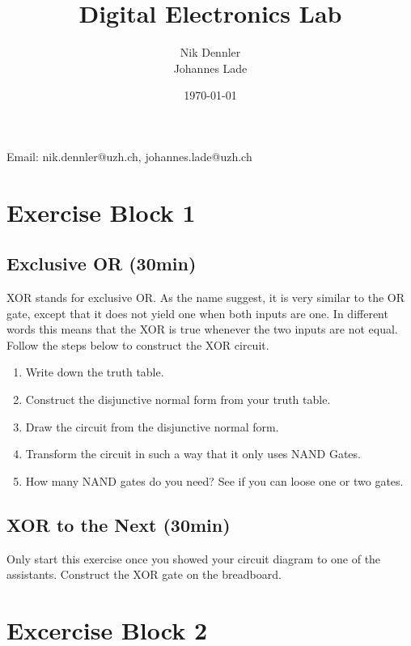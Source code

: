 \documentclass[10pt,a4paper]{article}
\author{Nik Dennler \\ Johannes Lade}
\title{Digital Electronics Lab}
\date{\today{}}
\begin{document}
	
\begin{titlepage}
	\maketitle
		\begin{center}
			Email: nik.dennler@uzh.ch, johannes.lade@uzh.ch
		\end{center}
	\thispagestyle{empty}
\end{titlepage}




\tableofcontents
\newpage
\newpage
\section{Exercise Block 1}
\label{sec:exercise-block-1}

\subsection{Exclusive OR (30min)}\label{subsec:ex-1}

XOR stands for exclusive OR. As the name suggest, it is very similar to the OR gate, except that it does not yield one when both inputs are one. In different words this means that the XOR is true whenever the two inputs are not equal. Follow the steps below to construct the XOR circuit.
\begin{enumerate}
	\item Write down the truth table.
	\item\label{it:1} Construct the disjunctive normal form from your truth table.
	\item Draw the circuit from the disjunctive normal form.
	\item Transform the circuit in such a way that it only uses NAND Gates.
	\item How many NAND gates do you need? See if you can loose one or two gates.
\end{enumerate}

\subsection{XOR to the Next (30min)}
Only start this exercise once you showed your circuit diagram to one of the assistants.
Construct the XOR gate on the breadboard.

\section{Excercise Block 2}
\end{document}
